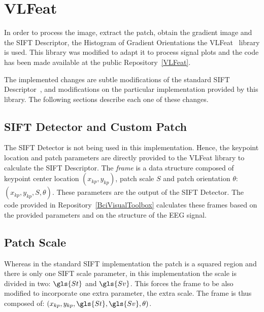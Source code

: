 
\section{VLFeat}

In order to process the image, extract the patch, obtain the gradient image and the SIFT Descriptor, the Histogram of Gradient Orientations the VLFeat~\cite{Vedaldi2010} library is used.   This library was modified to adapt it to process signal plots and the code has been made available at the public Repository~\ref{VLFeat}. 

The implemented changes are subtle modifications of the standard SIFT Descriptor~\cite{Rey-Otero2014}, and modifications on the particular implementation provided by this library.  The following sections describe each one of these changes.

\subsection{SIFT Detector and Custom Patch}

The SIFT Detector is not being used in this implementation.  Hence, the keypoint location and patch parameters are directly provided to the VLFeat library to calculate the SIFT Descriptor.  The \textit{frame} is a data structure composed of keypoint center location  $(x_{kp}, y_{kp})$, patch scale  $S$ and patch orientation $\theta$: $ ( x_{kp}, y_{kp}, S, \theta ) $. These parameters are the output of the SIFT Detector.  The code provided in Repository~\ref{BciVisualToolbox} calculates these frames based on the provided parameters and on the structure of the EEG signal.

\subsection{Patch Scale}

Whereas in the standard SIFT implementation the patch is a squared region and there is only one SIFT scale parameter, in this implementation the scale is divided in two: $\gls{St}$ and $\gls{Sv}$.  This forces the frame to be also modified to incorporate one extra parameter, the extra scale.  The frame is thus composed of: $ ( x_{kp}, y_{kp}, \gls{St}, \gls{Sv}, \theta ) $.  

